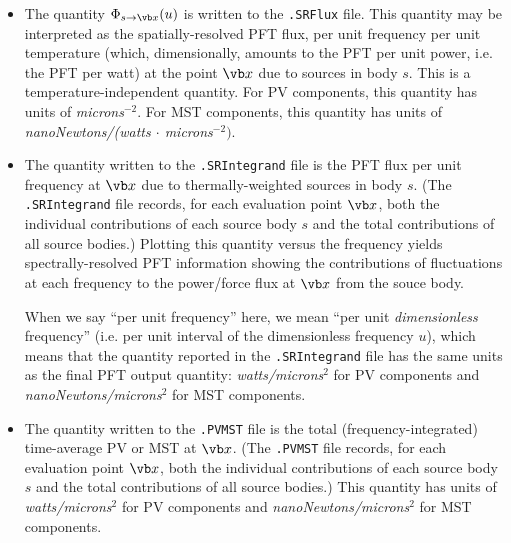 \documentclass[letterpaper]{article}
\begin{document}
\begin{itemize}
  \item The quantity $\Phi_{s\to \vb x}(u)$ is written to the
        \texttt{.SRFlux} file. This quantity may be interpreted
        as the spatially-resolved PFT flux, per unit frequency 
        per unit temperature (which, dimensionally, amounts to 
        the PFT per unit power, i.e. the PFT per watt)
        at the point $\vb x$ due to sources
        in body $s.$ This is a temperature-independent quantity.
        For PV components,
        this quantity has units of \textit{microns$^{-2}$}.
        For MST components,
        this quantity has units of 
        \textit{nanoNewtons/(watts $\cdot$ microns$^{-2})$}.

  \item The quantity written to the \texttt{.SRIntegrand} file
        is the PFT flux per unit frequency at $\vb x$
        due to thermally-weighted sources in body $s$.
        (The \texttt{.SRIntegrand} file records, for each
         evaluation point $\vb x$, both the individual 
         contributions of each source body $s$ and the total 
         contributions of all source bodies.) Plotting this quantity
         versus the frequency yields spectrally-resolved
         PFT information showing the contributions of fluctuations
         at each frequency to the power/force flux at $\vb x$
         from the souce body.

         When we say ``per unit frequency'' here, we mean 
         ``per unit \textit{dimensionless} frequency'' 
         (i.e. per unit interval of the dimensionless 
          frequency $u$), which means that the quantity 
         reported in the \texttt{.SRIntegrand} file has the 
         same units as the final PFT output quantity:
         \textit{watts/microns$^2$} for PV components and 
         \textit{nanoNewtons/microns$^2$} for MST components.

  \item The quantity written to the \texttt{.PVMST} file
        is the total (frequency-integrated) time-average 
        PV or MST at $\vb x$.
        (The \texttt{.PVMST} file records, for each
         evaluation point $\vb x$, both the individual contributions
         of each source body $s$ and the total contributions
         of all source bodies.)
         This quantity has units of 
         \textit{watts/microns$^2$} for PV components and 
         \textit{nanoNewtons/microns$^2$} for MST components.
\end{itemize}
\end{document}
